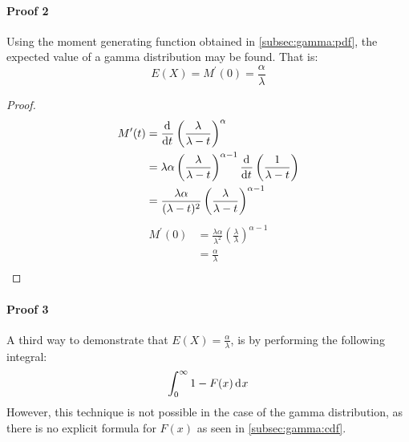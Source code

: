 \documentclass[12pt]{article}
\begin{document}
\paragraph{Proof 2}
Using the moment generating function obtained in \autoref{subsec:gamma:pdf}, the expected value of a gamma distribution
may be found. That is:
\begin{equation}
	E(X) = M^\prime(0) = \frac{\alpha}{\lambda}
\end{equation}
\begin{proof}
	\begin{equation}\label{eq:gamma:mgfprime}
		\begin{split}
			M^\prime(t)	&=	\mathop{}\!\frac{\mathrm{d}^{}}{\mathrm{d}t^{}}\left(\frac{\lambda}{\lambda - t}\right)^\alpha\\
						&=	\lambda\alpha\left(\frac{\lambda}{\lambda - t}\right)^{\alpha-1}\mathop{}\!\frac{\mathrm{d}^{}}{\mathrm{d}t^{}}\left(\frac{1}{\lambda - t}\right)\\
						&=	\frac{\lambda\alpha}{(\lambda - t)^2}\left(\frac{\lambda}{\lambda - t}\right)^{\alpha-1}
		\end{split}
	\end{equation}
	\begin{equation}
		\begin{split}
			M^\prime(0)	&=	\frac{\lambda\alpha}{\lambda^2}\left(\frac{\lambda}{\lambda}\right)^{\alpha-1}\\
						&=	\frac{\alpha}{\lambda}\\
		\end{split}
	\end{equation}
\end{proof}

\paragraph{Proof 3}
A third way to demonstrate that $E(X) = \frac{\alpha}{\lambda}$, is by performing the following integral:
\begin{equation}
	\int^\infty_0 1-F(x)\mathop{}\!\mathrm{d^{}}x
\end{equation}
However, this technique is not possible in the case of the gamma distribution, as there is no explicit formula for $F(x)$
as seen in \autoref{subsec:gamma:cdf}.
\end{document}
